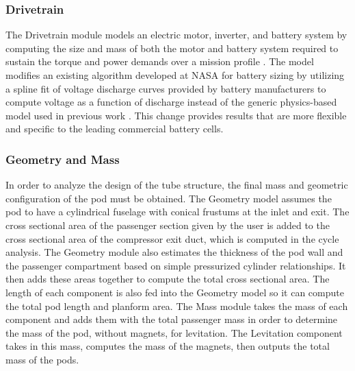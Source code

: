   \subsubsection{Drivetrain}
    The Drivetrain module models an electric motor, inverter, and battery system by
    computing the size and mass of both the motor and battery system
	required to sustain the torque and power demands
	over a mission profile \cite{GeorgiaTechMotor, NASASugar}. The model
	modifies an existing algorithm developed at NASA for battery sizing by utilizing
  a spline fit of voltage discharge curves provided by battery manufacturers
  to compute voltage as a function of discharge instead of the generic physics-based
  model used in previous work \cite{NASASugar}.
  This change provides results that are more flexible and specific to the
	leading commercial battery cells.
\subsubsection{Geometry and Mass}
	In order to analyze the design of the tube structure, the final mass and
	geometric configuration of the pod must be obtained. The Geometry model
	assumes the pod to have a cylindrical fuselage with conical frustums at
	the inlet and exit. The cross sectional area of the passenger section
	given by the user is added to the cross sectional area of the compressor
	exit duct, which is computed in the cycle analysis. The Geometry module
	also estimates the thickness of the pod wall and the passenger compartment
	based on simple pressurized cylinder relationships. It then adds these areas
	together to compute the total cross sectional area. The length of each
	component is also fed into the Geometry model so it can compute the total
	pod length and planform area. The Mass module takes the mass of each
	component and adds them with the total passenger mass in order to determine
	the mass of the pod, without magnets, for levitation. The Levitation component
	takes in this mass, computes the mass of the magnets, then outputs the total mass of the pods.
